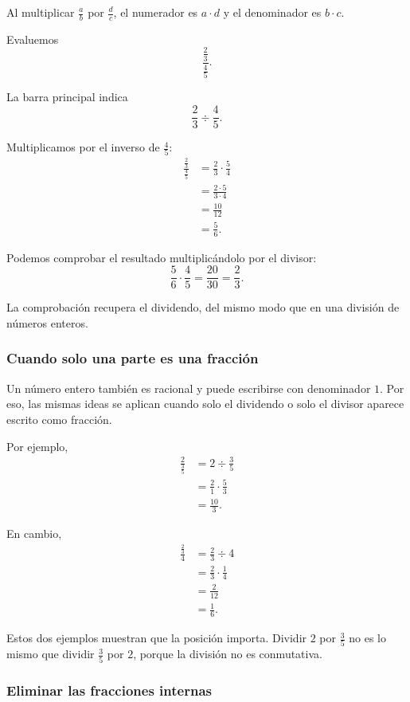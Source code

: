 Al multiplicar \(\frac ab\) por \(\frac dc\), el numerador es \(a\cdot d\) y
el denominador es \(b\cdot c\).

\begin{example}
Evaluemos
\[
\frac{\frac23}{\frac45}.
\]

La barra principal indica
\[
\frac23\div\frac45.
\]

Multiplicamos por el inverso de \(\frac45\):
\begin{align*}
\frac{\frac23}{\frac45}
&=
\frac23\cdot\frac54\\
&=
\frac{2\cdot5}{3\cdot4}\\
&=
\frac{10}{12}\\
&=
\frac56.
\end{align*}

Podemos comprobar el resultado multiplicándolo por el divisor:
\[
\frac56\cdot\frac45
=
\frac{20}{30}
=
\frac23.
\]

La comprobación recupera el dividendo, del mismo modo que en una división de
números enteros.
\end{example}

\subsubsection{Cuando solo una parte es una fracción}

Un número entero también es racional y puede escribirse con denominador \(1\).
Por eso, las mismas ideas se aplican cuando solo el dividendo o solo el divisor
aparece escrito como fracción.

Por ejemplo,
\begin{align*}
\frac{2}{\frac35}
&=
2\div\frac35\\
&=
\frac21\cdot\frac53\\
&=
\frac{10}{3}.
\end{align*}

En cambio,
\begin{align*}
\frac{\frac23}{4}
&=
\frac23\div4\\
&=
\frac23\cdot\frac14\\
&=
\frac{2}{12}\\
&=
\frac16.
\end{align*}

Estos dos ejemplos muestran que la posición importa. Dividir \(2\) por
\(\frac35\) no es lo mismo que dividir \(\frac35\) por \(2\), porque la
división no es conmutativa.

\subsubsection{Eliminar las fracciones internas}


